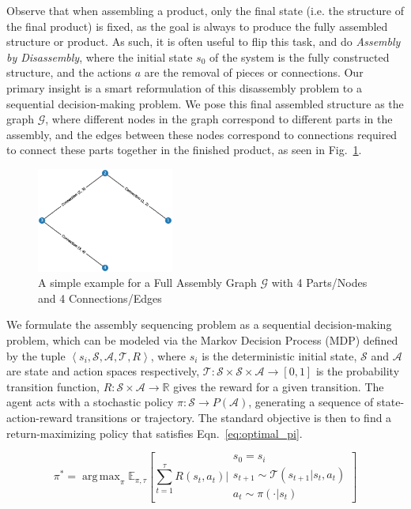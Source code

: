 \documentclass{article}
\DeclareMathOperator*{\argmax}{arg\,max}
\begin{document}
Observe that when assembling a product, only the final state (i.e. the structure of the final product) is fixed, as the goal is always to produce the fully assembled structure or product. As such, it is often useful to flip this task, and do \emph{Assembly by Disassembly}, where the initial state $s_0$ of the system is the fully constructed structure, and the actions $a$ are the removal of pieces or connections. Our primary insight is a smart reformulation of this disassembly problem to a sequential decision-making problem. We pose this final assembled structure as the graph $\mathcal{G}$, where different nodes in the graph correspond to different parts in the assembly, and the edges between these nodes correspond to connections required to connect these parts together in the finished product, as seen in Fig.~\ref{fig: G}.


\begin{figure}[!htb]
    \centering
    \includegraphics[width=0.4\textwidth]{figs/FullyAssembled.eps}
      \caption{A simple example for a Full Assembly Graph $\mathcal{G}$ with 4 Parts/Nodes and 4 Connections/Edges}
      \label{fig: G}
\end{figure}


We formulate the assembly sequencing problem as a sequential decision-making problem, which can be modeled via the Markov Decision Process (MDP) defined by the tuple $\left\langle s_i, \mathcal{S}, \mathcal{A}, \mathcal{T}, R\right\rangle$, where $s_i$ is the deterministic initial state, $\mathcal{S}$ and $\mathcal{A}$ are state and action spaces respectively, $\mathcal{T}: \mathcal{S} \times \mathcal{S} \times \mathcal{A} \rightarrow [0,1]$ is the probability transition function, $R: \mathcal{S} \times \mathcal{A} \rightarrow \mathbb{R}$ gives the reward for a given transition. The agent acts with a stochastic policy $\pi: \mathcal{S} \rightarrow P(\mathcal{A})$, generating a sequence of state-action-reward transitions or trajectory. The standard objective is then to find a return-maximizing policy that satisfies Eqn.~\ref{eq:optimal_pi}.

\begin{equation} \label{eq:optimal_pi}
    \pi^* = \argmax_{\pi} \mathbb{E}_{\pi, \tau}\left [\sum_{t=1}^{\tau} R(s_t,a_t) \bigg|
    \begin{array}{c}
        s_0=s_i\\
        s_{t+1}\sim \mathcal{T}(s_{t+1} | s_t, a_t)\\
        a_t\sim \pi(\cdot | s_t)
    \end{array}
    \right ]
\end{equation}
\end{document}
